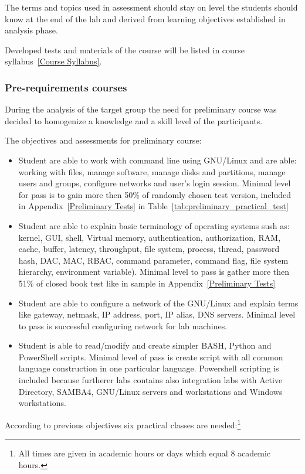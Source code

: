 The terms and topics used in assessment should stay on level the students should know at the end of the lab and derived from learning objectives established in analysis phase.

Developed tests and materials of the course will be listed in course syllabus~\ref{Course Syllabus}.

\subsubsection{Pre-requirements courses}

During the analysis of the target group the need for preliminary course was decided to homogenize a knowledge and a skill level of the participants.

The objectives and assessments for preliminary course:
\begin{itemize}
\item Student are able to work with command line using GNU/Linux and are able: working with files, manage software, manage disks and partitions, manage users and groups, configure networks and user's login session. Minimal level for pass is to gain more then 50\% of randomly chosen test version, included in Appendix~\ref{Preliminary Tests} in Table~\ref{tab:preliminary_practical_test}
\item Student are able to explain basic terminology of operating systems sush as: kernel, GUI, shell, Virtual memory, authentication, authorization, RAM, cache, buffer, latency, throughput, file system, process, thread, password hash, DAC, MAC, RBAC, command parameter, command flag, file system hierarchy, environment variable). Minimal level to pass is gather more then 51\% of closed book test like in sample in Appendix~\ref{Preliminary Tests}
\item Student are able to configure a network of the GNU/Linux and explain terms like gateway, netmask, IP address, port, IP alias, DNS servers. Minimal level to pass is successful configuring network for lab machines.
\item Student is able to read/modify and create simpler BASH, Python and PowerShell scripts. Minimal level of pass is create script with all common language construction in one particular language. Powershell scripting is included because furtherer labs contains also integration labs with Active Directory, SAMBA4, GNU/Linux servers and workstations and Windows workstations.
\end{itemize}

According to previous objectives six practical classes are needed:\footnote{All times are given in academic hours or days which equal 8 academic hours.}

